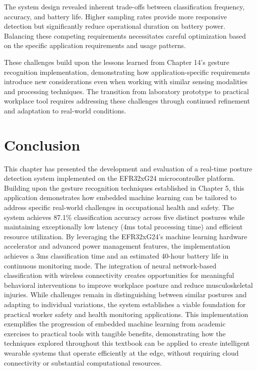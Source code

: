 \documentclass[
  9pt,
  letterpaper,
  abstract,
  titlepage]{scrbook}
\begin{document}
The system design revealed inherent trade-offs between classification
frequency, accuracy, and battery life. Higher sampling rates provide
more responsive detection but significantly reduce operational duration
on battery power. Balancing these competing requirements necessitates
careful optimization based on the specific application requirements and
usage patterns.

These challenges build upon the lessons learned from Chapter 14's
gesture recognition implementation, demonstrating how
application-specific requirements introduce new considerations even when
working with similar sensing modalities and processing techniques. The
transition from laboratory prototype to practical workplace tool
requires addressing these challenges through continued refinement and
adaptation to real-world conditions.

\section{Conclusion}\label{conclusion-4}

This chapter has presented the development and evaluation of a real-time
posture detection system implemented on the EFR32xG24 microcontroller
platform. Building upon the gesture recognition techniques established
in Chapter 5, this application demonstrates how embedded machine
learning can be tailored to address specific real-world challenges in
occupational health and safety. The system achieves 87.1\%
classification accuracy across five distinct postures while maintaining
exceptionally low latency (4ms total processing time) and efficient
resource utilization. By leveraging the EFR32xG24's machine learning
hardware accelerator and advanced power management features, the
implementation achieves a 3ms classification time and an estimated
40-hour battery life in continuous monitoring mode. The integration of
neural network-based classification with wireless connectivity creates
opportunities for meaningful behavioral interventions to improve
workplace posture and reduce musculoskeletal injuries. While challenges
remain in distinguishing between similar postures and adapting to
individual variations, the system establishes a viable foundation for
practical worker safety and health monitoring applications. This
implementation exemplifies the progression of embedded machine learning
from academic exercises to practical tools with tangible benefits,
demonstrating how the techniques explored throughout this textbook can
be applied to create intelligent wearable systems that operate
efficiently at the edge, without requiring cloud connectivity or
substantial computational resources.
\end{document}
